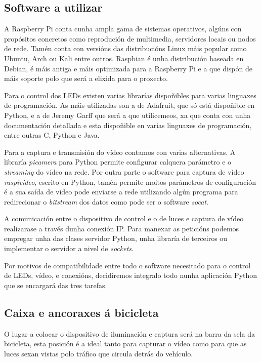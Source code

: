 \subsection{Software a utilizar}
A Raspberry Pi conta cunha ampla gama de sistemas operativos, algúns con propósitos concretos como reprodución de multimedia, servidores locais ou nodos de rede. Tamén conta con versións das distribucións Linux máis popular como Ubuntu, Arch ou Kali entre outros.
Raspbian é unha distribución baseada en Debian, é máis antiga e máis optimizada para a Raspberry Pi e a que dispón de máis soporte polo que será a elixida para o proxecto.

Para o control dos LEDs existen varias librarías dispoñibles para varias linguaxes de programación. As máis utilizadas son a de Adafruit, que só está dispoñible en Python, e a de Jeremy Garff que será a que utilicemeos, xa que conta con unha documentación detallada e esta dispoñible en varias linguaxes de programación, entre outras C, Python e Java.

Para a captura e transmisión do vídeo contamos con varias alternativas. A libraría \emph{picamera} para Python permite configurar calquera parámetro e o \emph{streaming} do vídeo na rede. Por outra parte o software para captura de vídeo \emph{raspivideo}, escrito en Python, tamén permite moitos parámetros de configuración é a sua saída de vídeo pode enviarse a rede utilizando algún programa para redirecionar o \emph{bitstream} dos datos como pode ser o software \emph{socat}.

A comunicación entre o dispositivo de control e o de luces e captura de vídeo realizarase a través dunha conexión IP. Para manexar as peticións podemos empregar unha das clases servidor Python, unha libraría de terceiros ou implementar o servidor a nivel de \emph{sockets}.

Por motivos de compatibilidade entre todo o software necesitado para o control de LEDs, vídeo, e conexións, decidiremos integralo todo nunha aplicación Python que se encargará das tres tarefas.

\subsection{Caixa e ancoraxes á bicicleta}


O lugar a colocar o dispositivo de iluminación e captura será na barra da sela da bicicleta, esta posición é a ideal tanto para capturar o vídeo como para que as luces sexan vistas polo tráfico que circula detrás do vehículo.

